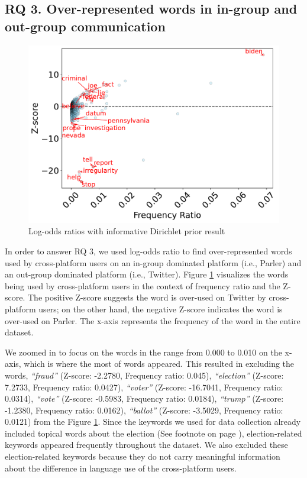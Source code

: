 \documentclass[Crown,sagev,times]{sagej}
\begin{document}
\subsection{RQ 3. Over-represented words in in-group and out-group communication} \label{sec:RQ3}

\begin{figure}[htp]
  \centering
  \includegraphics[scale=0.5]{figure/RQ4rr-parler-twitter-comparison-new.pdf}
  \caption{Log-odds ratios with informative Dirichlet prior result}
  \label{fig: log-odds ratios}
\end{figure}

In order to answer RQ 3, we used log-odds ratio \cite{monroe2008fightin} to find over-represented words used by cross-platform users on an in-group dominated platform (i.e., Parler) and an out-group dominated platform (i.e., Twitter). 
Figure \ref{fig: log-odds ratios} visualizes the words being used by cross-platform users in the context of frequency ratio and the Z-score. The positive Z-score suggests the word is over-used on Twitter by cross-platform users; on the other hand, the negative Z-score indicates the word is over-used on Parler. The x-axis represents the frequency of the word in the entire dataset.

We zoomed in to focus on the words in the range from 0.000 to 0.010 on the x-axis, which is where the most of words appeared. This resulted in excluding the words, \textit{``fraud''} (Z-score: -2.2780, Frequency ratio: 0.045), \textit{``election''} (Z-score: 7.2733, Frequency ratio: 0.0427), \textit{``voter''} (Z-score: -16.7041, Frequency ratio: 0.0314), \textit{``vote''} (Z-score: -0.5983, Frequency ratio: 0.0184), \textit{``trump''} (Z-score: -1.2380, Frequency ratio: 0.0162), \textit{``ballot''} (Z-score: -3.5029, Frequency ratio: 0.0121) from the Figure \ref{fig: log-odds ratios}.
Since the keywords we used for data collection already included topical words about the election (See footnote  on page \pageref{footnote1}), election-related keywords appeared frequently throughout the dataset. We also excluded these election-related keywords because  they do not carry meaningful information about the difference in language use of the cross-platform users.
\end{document}
